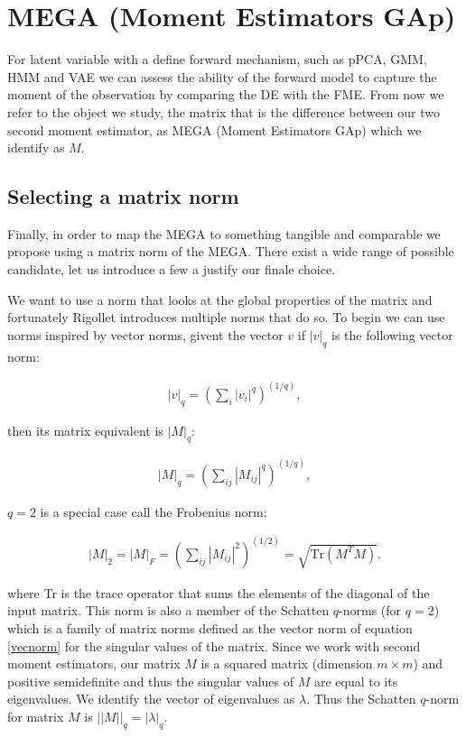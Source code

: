 \documentclass{article}
\begin{document}
 

\section{MEGA (Moment Estimators GAp)}

For latent variable with a define forward mechanism, such as pPCA, GMM, HMM and VAE we can assess the ability of the forward model to capture the moment of the observation by comparing the DE with the FME. From now we refer to the object we study, the matrix that is the difference between our two second moment estimator, as MEGA (Moment Estimators GAp) which we identify as $M$. 

\subsection{Selecting a matrix norm}

Finally, in order to map the MEGA to something tangible and comparable we propose using a matrix norm of the MEGA. There exist a wide range of possible candidate, let us introduce a few a justify our finale choice. 

\bigskip

We want to use a norm that looks at the global properties of the matrix and fortunately Rigollet \cite{rigollet15} introduces multiple norms that do so. To begin we can use norms inspired by vector norms, givent the vector $v$ if $|v|_q$ is the following vector norm:

\begin{align}
|v|_q = (\sum_i |v_i|^q)^{(1/q)},
\label{vecnorm}
\end{align}

then its matrix equivalent is $|M|_q$:

\begin{align}
|M|_q = (\sum_{ij} |M_{ij}|^q)^{(1/q)},
\label{matnorm}
\end{align}

$q=2$ is a special case call the Frobenius norm:

\begin{align}
|M|_2 = |M|_F = (\sum_{ij} |M_{ij}|^2)^{(1/2)} = \sqrt{\text{Tr}(M^TM)}.
\label{Frobe}
\end{align}

where Tr is the trace operator that sums the elements of the diagonal of the input matrix. This norm is also a member of the Schatten $q$-norms (for $q=2$) which is a family of matrix norms defined as the vector norm of equation \ref{vecnorm} for the singular values of the matrix. Since we work with second moment estimators, our matrix $M$ is a squared matrix (dimension $m \times m$) and positive semidefinite and thus the singular values of $M$ are equal to its eigenvalues.  We identify the vector of eigenvalues as $\lambda$. Thus the  Schatten $q$-norm for matrix $M$ is $||M||_q=|\lambda|_q$. 
\end{document}
